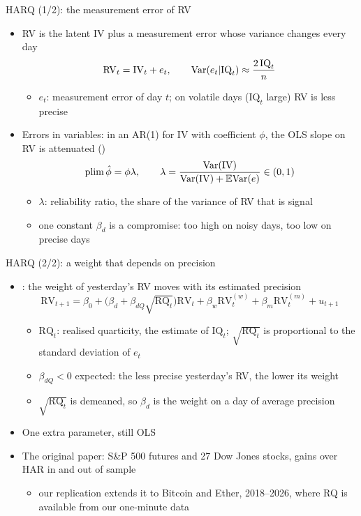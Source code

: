 \begin{frame}{HARQ (1/2): the measurement error of RV}
\itemsize{\small}
\begin{itemize}
    \item RV is the latent IV plus a measurement error whose variance changes every day
    \[ \mathrm{RV}_t = \mathrm{IV}_t + e_t, \qquad \text{Var}(e_t | \mathrm{IQ}_t) \approx \frac{2\,\mathrm{IQ}_t}{n} \]
    \begin{itemize}
        \item $e_t$: measurement error of day $t$; on volatile days ($\mathrm{IQ}_t$ large) RV is less precise
    \end{itemize}
    \item Errors in variables: in an AR(1) for IV with coefficient $\phi$, the OLS slope on RV is attenuated ()
    \[ \mathrm{plim}\,\hat\phi = \phi\lambda, \qquad \lambda = \frac{\text{Var}(\mathrm{IV})}{\text{Var}(\mathrm{IV}) + \mathbb{E}\text{Var}(e)} \in (0, 1) \]
    \begin{itemize}
        \item $\lambda$: reliability ratio, the share of the variance of RV that is signal
        \item one constant $\beta_d$ is a compromise: too high on noisy days, too low on precise days
    \end{itemize}
\end{itemize}
\end{frame}

\begin{frame}{HARQ (2/2): a weight that depends on precision}
\itemsize{\small}
\begin{itemize}
    \item {}: the weight of yesterday's RV moves with its estimated precision
    \[ \mathrm{RV}_{t+1} = \beta_0 + \big(\beta_d + \beta_{dQ}\sqrt{\mathrm{RQ}_t}\big)\mathrm{RV}_t + \beta_w\mathrm{RV}^{(w)}_t + \beta_m\mathrm{RV}^{(m)}_t + u_{t+1} \]
    \begin{itemize}
        \item $\mathrm{RQ}_t$: realised quarticity, the estimate of $\mathrm{IQ}_t$; $\sqrt{\mathrm{RQ}_t}$ is proportional to the standard deviation of $e_t$
        \item $\beta_{dQ} < 0$ expected: the less precise yesterday's RV, the lower its weight
        \item $\sqrt{\mathrm{RQ}_t}$ is demeaned, so $\beta_d$ is the weight on a day of average precision
    \end{itemize}
    \item One extra parameter, still OLS
    \item The original paper: S\&P 500 futures and 27 Dow Jones stocks, gains over HAR in and out of sample
    \begin{itemize}
        \item our replication extends it to Bitcoin and Ether, 2018--2026, where RQ is available from our one-minute data
    \end{itemize}
\end{itemize}
\end{frame}


